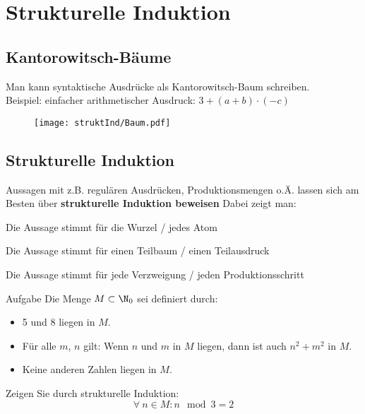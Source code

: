 
\section{Strukturelle Induktion}
\subsection{Kantorowitsch-Bäume}
\begin{frame}
	Man kann syntaktische Ausdrücke als Kantorowitsch-Baum schreiben. \\
	Beispiel: einfacher arithmetischer Ausdruck: $3 + (a + b) \cdot (-c)$ \pause
	\begin{figure}[H]
		\centering
		\texttt{[image: struktInd/Baum.pdf]}
	\end{figure}
\end{frame}

\subsection{Strukturelle Induktion}
\begin{frame}
	Aussagen mit z.B. regulären Ausdrücken, Produktionsmengen o.Ä. lassen sich am Besten über \textbf{strukturelle Induktion beweisen} \pause
	Dabei zeigt man:
	\begin{description}[<+->]
		\item[Induktionsanfang] Die Aussage stimmt für die Wurzel / jedes Atom
		\item[Induktionsvoraussetzung] Die Aussage stimmt für einen Teilbaum / einen Teilausdruck
		\item[Induktionsschluss] Die Aussage stimmt für jede Verzweigung / jeden Produktionsschritt
	\end{description}
\end{frame}

\begin{frame}{Aufgabe}
	Die Menge $M \subset \N_0$ sei definiert durch:
	\begin{itemize}
		\item 5 und 8 liegen in $M$.
		\item Für alle $m$, $n$ gilt: Wenn $n$ und $m$ in $M$ liegen, dann ist auch $n^2 + m^2$ in $M$.
		\item Keine anderen Zahlen liegen in $M$.
	\end{itemize}
	Zeigen Sie durch strukturelle Induktion:
		$$\forall \ n \in M : n \mod 3 = 2$$
\end{frame}


